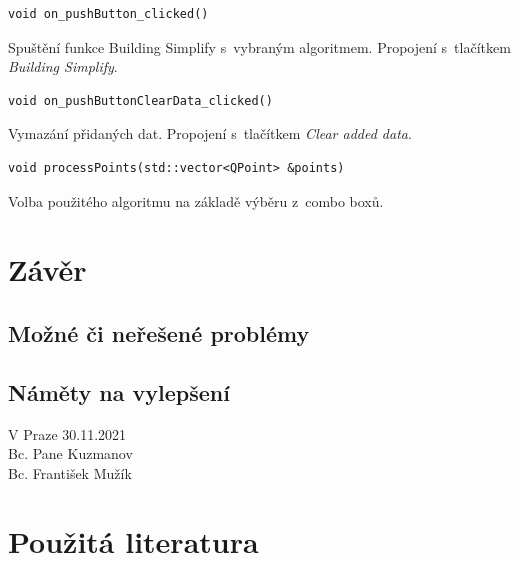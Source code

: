 \documentclass[a4paper, 12pt, oneside, titlepage]{article} %
\begin{document}
\begin{verbatim}
void on_pushButton_clicked()
\end{verbatim}
Spuštění funkce Building Simplify s~vybraným algoritmem. Propojení s~tlačítkem \emph{Building Simplify}.\\

\begin{verbatim}
void on_pushButtonClearData_clicked()
\end{verbatim}
Vymazání přidaných dat. Propojení s~tlačítkem \emph{Clear added data}.\\

\begin{verbatim}
void processPoints(std::vector<QPoint> &points)
\end{verbatim}
Volba použitého algoritmu na základě výběru z~combo boxů.\\



\section{Závěr}






\subsection{Možné či neřešené problémy} \label{mcn_problemy}


\subsection{Náměty na vylepšení} \label{vylepseni}



\begin{flushright}
V Praze 30.11.2021\\
\vspace{2mm}
Bc. Pane Kuzmanov\\
Bc. František Mužík\\
\end{flushright}


\clearpage 
\section*{Použitá literatura}
\renewcommand{\section}[2]{}%


\end{document}
